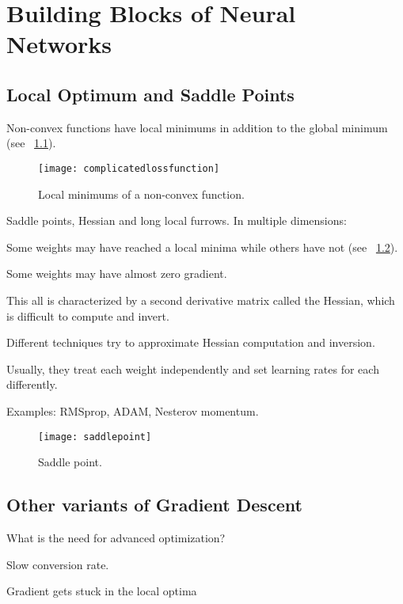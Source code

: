 	\chapter{Building Blocks of Neural Networks}

	\section{Local Optimum and Saddle Points}
Non-convex functions have local minimums in addition to the global minimum (see \figurename~\ref{fig:complicatedlossfunction}).
 	\begin{figure}[htb]
		\centering
		\texttt{[image: complicatedlossfunction]}
		\caption[Local minimums of a non-convex function]{Local minimums of a non-convex function.}
		\label{fig:complicatedlossfunction}
	\end{figure}

Saddle points, Hessian and long local furrows.  In multiple dimensions:
	\begin{bulletedlist}
		\item Some weights may have reached a local minima while others have not (see \figurename~\ref{fig:saddlepoint}).
		\item Some weights may have almost zero gradient.
		\item This all is characterized by a second derivative matrix called the Hessian, which is difficult to compute and invert.
		\item Different techniques try to approximate Hessian computation and inversion.
		\item Usually, they treat each weight independently and set learning rates for each differently.
		\item Examples: RMSprop, ADAM, Nesterov momentum.
	\end{bulletedlist}
 	\begin{figure}[htb]
		\centering
		\texttt{[image: saddlepoint]}
		\caption[Saddle point]{Saddle point.}
		\label{fig:saddlepoint}
	\end{figure}


	\section{Other variants of Gradient Descent}
What is the need for advanced optimization?
	\begin{bulletedlist}
		\item Slow conversion rate.
		\item Gradient gets stuck in the local optima
	\end{bulletedlist}

